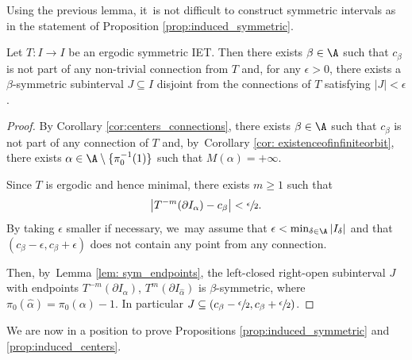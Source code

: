 Using the previous lemma, it~is not difficult to construct symmetric intervals as in the statement of Proposition \ref{prop:induced_symmetric}.

\begin{lemma}
\label{lem:sym_int_disjoint}
Let $T: I \to I$ be an ergodic symmetric IET. Then there exists $\beta \in \A$ such that $c_\beta$ is not part of any non-trivial connection from $T$ and, for any $\epsilon > 0$, there exists a $\beta$-symmetric subinterval $J\subseteq I$ disjoint from the connections of $T$ satisfying $|J| < \epsilon$.
\end{lemma}

\begin{proof}
By Corollary \ref{cor:centers_connections}, there exists $\beta \in \A$ such that $c_\beta$ is not part of any connection of $T$ and, by~Corollary \ref{cor: existenceofinfiniteorbit}, there exists $\alpha \in \A \setminus \{\pi_0^{-1}(1)\}$ such that $M(\alpha) = +\infty$.

Since $T$ is ergodic and hence minimal, there exists $m \geq 1$ such that
\[
\big|T^{-m}(\partial I_\alpha) - c_\beta \big| < \sfrac{\epsilon}{2}.
\]
By taking $\epsilon$ smaller if necessary, we~may assume that $\epsilon < \min_{\delta \in \A} |I_\delta|$ and that $(c_\beta - \epsilon, c_\beta + \epsilon)$ does not contain any point from any connection.

Then, by~Lemma \ref{lem: sym_endpoints}, the left-closed right-open subinterval $J$ with endpoints $T^{-m}(\partial I_\alpha)$, $T^{m}(\partial I_{\hat \alpha})$ is $\beta$-symmetric, where $\pi_0(\hat \alpha) = \pi_0(\alpha) - 1$. In particular $J \subseteq (c_\beta - \sfrac{\epsilon}{2}, c_\beta + \sfrac{\epsilon}{2})$.
\end{proof}

We are now in a position to prove Propositions \ref{prop:induced_symmetric} and \ref{prop:induced_centers}.

